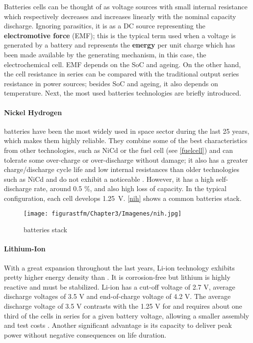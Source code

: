 Batteries cells can be thought of as voltage sources with small internal resistance which respectively decreases and increases linearly with the nominal capacity discharge. Ignoring parasitics, it is as a \acrshort{DC} source representing the \textbf{electromotive force} (\acrshort{EMF}); this is the typical term used when a voltage is generated by a battery and represents the \textbf{energy} per unit charge which has been made available by the generating mechanism, in this case, the electrochemical cell. \acrshort{EMF} depends on the \acrshort{SoC} and ageing. On the other hand, the cell resistance in series can be compared with the traditional output series resistance in power sources; besides \acrshort{SoC} and ageing, it also depends on temperature. Next, the most used batteries technologies are briefly introduced.

\paragraph{Nickel Hydrogen}

 batteries have been the most widely used in space sector during the last 25 years, which makes them highly reliable. They combine some of the best characteristics from other technologies, such as NiCd or the fuel cell (see \ref{fuelcell}) and can tolerate some over-charge or over-discharge without damage; it also has a greater charge/discharge cycle life and low internal resistances than older technologies such as NiCd and do not exhibit a noticeable . However, it has a high self-discharge rate, around 0.5 \%, and also high loss of capacity. In the typical configuration, each cell develops 1.25~V. \autoref{nih} shows a common  batteries stack.

				\begin{figure} [H] 				
				\centering
				\texttt{[image: figurastfm/Chapter3/Imagenes/nih.jpg]}
				\caption{ batteries stack \cite{upsnih}} \label{nih}
			\end{figure}
	
\paragraph{Lithium-Ion}	

With a great expansion throughout the last years, Li-ion technology exhibits pretty higher energy density than . It is corrosion-free but lithium is highly reactive and must be stabilized. Li-ion has a cut-off voltage of 2.7 V, average discharge voltages of 3.5 V and end-of-charge voltage of 4.2 V. The average discharge voltage of 3.5 V contrasts with the 1.25 V for  and  requires about one third of the cells in series for a given battery voltage, allowing a smaller assembly and test costs \cite{spacecraftspower}. Another significant advantage is its capacity to deliver peak power without negative consequences on life duration.

